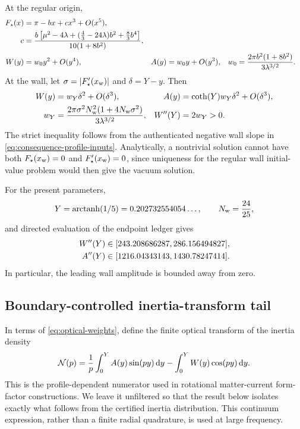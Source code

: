 At the regular origin,
\begin{align}
 F_\star(x)&=\pi-bx+cx^3+O(x^5),
 \notag\\
 c&=\frac{b\left[\mu^2-4\lambda+
       (\frac43-24\lambda)b^2+\frac83b^4\right]}
       {10(1+8b^2)},
 \label{eq:origin-profile-jet}\\
 W(y)&=w_0y^2+O(y^4),
 &A(y)&=w_0y+O(y^3),
 &w_0&=\frac{2\pi b^2(1+8b^2)}{3\lambda^{3/2}}.
 \label{eq:origin-optical-jets}
\end{align}
At the wall, let $\sigma=\left\lvert F_\star'(x_{\rm w})\right\rvert$ and
$\delta=Y-y$.  Then
\begin{align}
 W(y)&=w_Y\delta^2+O(\delta^3),
 &A(y)&=\coth(Y)w_Y\delta^2+O(\delta^3),
 \label{eq:wall-optical-jets}\\
 w_Y&=\frac{2\pi\sigma^2N_{\rm w}^2
        (1+4N_{\rm w}\sigma^2)}{3\lambda^{3/2}},
 &W''(Y)&=2w_Y>0.
 \label{eq:wall-second-jet}
\end{align}
The strict inequality follows from the authenticated negative wall slope in
\cref{eq:consequence-profile-inputs}.  Analytically, a nontrivial solution
cannot have both $F_\star(x_{\rm w})=0$ and
$F_\star'(x_{\rm w})=0$, since uniqueness for the regular wall initial-value
problem would then give the vacuum solution.

For the present parameters,
\begin{equation}
 Y=\operatorname{arctanh}(1/5)=0.202732554054\ldots,
 \qquad N_{\rm w}=\frac{24}{25},
\end{equation}
and directed evaluation of the endpoint ledger gives
\begin{align}
 W''(Y)&\in[243.208686287,286.156494827],
 \notag\\
 A''(Y)&\in[1216.04343143,1430.78247414].
 \label{eq:certified-endpoint-ledger}
\end{align}
In particular, the leading wall amplitude is bounded away from zero.

\subsection{Boundary-controlled inertia-transform tail}
\label{sec:form-factor-tail}

In terms of \cref{eq:optical-weights}, define the finite optical transform of
the inertia density
\begin{equation}
 \mathcal N(p)
 =\frac1p\int_0^Y A(y)\sin(py)\,\mathrm d y
  -\int_0^Y W(y)\cos(py)\,\mathrm d y.
 \label{eq:exact-inertia-transform}
\end{equation}
This is the profile-dependent numerator used in rotational matter-current
form-factor constructions.  We leave it unfiltered so that the result below
isolates exactly what follows from the certified inertia distribution.  This
continuum expression, rather than a finite radial quadrature, is used at large
frequency.


